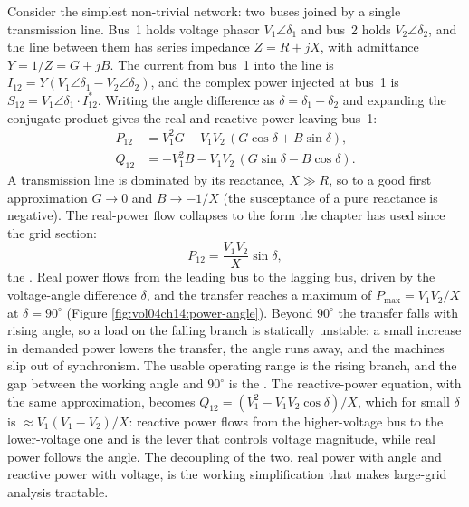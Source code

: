 Consider the simplest non-trivial network: two buses joined by a single
transmission line. Bus~1 holds voltage phasor $V_1\angle\delta_1$ and bus~2
holds $V_2\angle\delta_2$, and the line between them has series impedance
$Z = R + jX$, with admittance $Y = 1/Z = G + jB$. The current from bus~1
into the line is $I_{12} = Y(V_1\angle\delta_1 - V_2\angle\delta_2)$, and the
complex power injected at bus~1 is $S_{12} = V_1\angle\delta_1 \cdot
I_{12}^{\ast}$. Writing the angle difference as $\delta = \delta_1 -
\delta_2$ and expanding the conjugate product gives the real and reactive
power leaving bus~1:
\begin{align}
P_{12} &= V_1^2 G - V_1 V_2\,(G\cos\delta + B\sin\delta),\\
Q_{12} &= -V_1^2 B - V_1 V_2\,(G\sin\delta - B\cos\delta).
\end{align}
A transmission line is dominated by its reactance, $X \gg R$, so to a good
first approximation $G \to 0$ and $B \to -1/X$ (the susceptance of a pure
reactance is negative). The real-power flow collapses to the form the
chapter has used since the grid section:
\[
P_{12} = \frac{V_1 V_2}{X}\sin\delta,
\]
the . Real power flows from the leading bus to
the lagging bus, driven by the voltage-angle difference $\delta$, and the
transfer reaches a maximum of $P_{\max} = V_1 V_2 / X$ at $\delta = 90^\circ$
(Figure \ref{fig:vol04ch14:power-angle}). Beyond $90^\circ$ the transfer
falls with rising angle, so a load on the falling branch is statically
unstable: a small increase in demanded power lowers the transfer, the angle
runs away, and the machines slip out of synchronism. The usable operating
range is the rising branch, and the gap between the working angle and
$90^\circ$ is the . The reactive-power
equation, with the same approximation, becomes $Q_{12} = (V_1^2 - V_1 V_2
\cos\delta)/X$, which for small $\delta$ is $\approx V_1(V_1 - V_2)/X$:
reactive power flows from the higher-voltage bus to the lower-voltage one and
is the lever that controls voltage magnitude, while real power follows the
angle. The decoupling of the two, real power with angle and reactive power
with voltage, is the working simplification that makes large-grid analysis
tractable.



